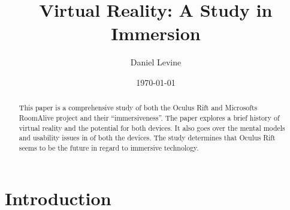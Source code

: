 \documentclass[a4paper]{article}
\title{Virtual Reality: A Study in Immersion}
\author{Daniel Levine}
\date{\today}
\begin{document}
\maketitle

\begin{abstract}
\indent \indent This paper is a comprehensive study of both the Oculus Rift and Microsofts RoomAlive project and their “immersiveness”. The paper explores a brief history of virtual reality and the potential for both devices. It also goes over the mental models and usability issues in of both the devices. The study determines that Oculus Rift seems to be the future in regard to immersive technology. 

\end{abstract}

\section{Introduction}
\end{document}
